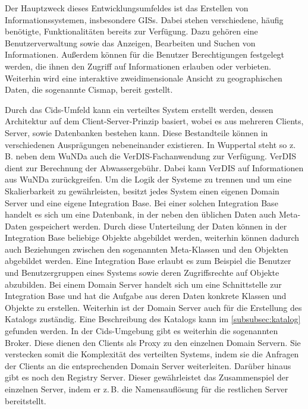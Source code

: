 Der Hauptzweck dieses Entwicklungsumfeldes ist das Erstellen von Informationssystemen, insbesondere \acfp{GIS}.
Dabei stehen verschiedene, häufig benötigte, Funktionalitäten bereits zur Verfügung. Dazu gehören eine Benutzerverwaltung sowie das Anzeigen, Bearbeiten und Suchen von Informationen.
Außerdem können für die Benutzer Berechtigungen festgelegt werden, die ihnen den Zugriff auf Informationen erlauben oder verbieten.
Weiterhin wird eine interaktive zweidimensionale Ansicht zu geographischen Daten, die sogenannte Cismap, bereit gestellt.

Durch das Cids-Umfeld kann ein verteiltes System erstellt werden, dessen Architektur auf dem Client-Server-Prinzip basiert, wobei es aus mehreren Clients, Server, sowie Datenbanken bestehen kann.
Diese Bestandteile können in verschiedenen Ausprägungen nebeneinander existieren.
In Wuppertal steht so z.\,B. neben dem \ac{WuNDa} auch die VerDIS-Fachanwendung zur Verfügung. VerDIS dient zur Berechnung der Abwassergebühr.
Dabei kann VerDIS auf Informationen aus \ac{WuNDa} zurückgreifen.
Um die Logik der Systeme zu trennen und um eine Skalierbarkeit zu gewährleisten, besitzt jedes System einen eigenen Domain Server und eine eigene Integration Base.
Bei einer solchen Integration Base handelt es sich um eine Datenbank, in der neben den üblichen Daten auch Meta-Daten gespeichert werden.
Durch diese Unterteilung der Daten können in der Integration Base beliebige Objekte abgebildet werden, weiterhin können dadurch auch Beziehungen zwischen den sogenannten Meta-Klassen und den Objekten abgebildet werden.
Eine Integration Base erlaubt es zum Beispiel die Benutzer und Benutzergruppen eines Systems sowie deren Zugriffsrechte auf Objekte abzubilden.
Bei einem Domain Server handelt sich um eine Schnittstelle zur Integration Base und hat die Aufgabe aus deren Daten konkrete Klassen und Objekte zu erstellen. Weiterhin ist der Domain Server auch für die Erstellung des Katalogs zuständig.
Eine Beschreibung des Katalogs kann im \autoref{subsubsec:katalog} gefunden werden.
In der Cids-Umgebung gibt es weiterhin die sogenannten Broker. Diese dienen den Clients als Proxy zu den einzelnen Domain Servern. Sie verstecken somit die Komplexität des verteilten Systems, indem sie die Anfragen der Clients an die entsprechenden Domain Server weiterleiten.
Darüber hinaus gibt es noch den Registry Server. Dieser gewährleistet das Zusammenspiel der einzelnen Server, indem er z.\,B. die Namensauflösung für die restlichen Server bereitstellt.

